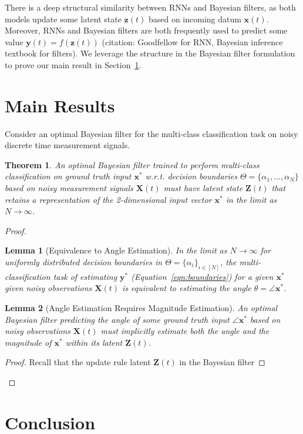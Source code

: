 \documentclass[12pt]{article}
\newtheorem{theorem}{Theorem}
\newtheorem{lemma}{Lemma}
\begin{document}
There is a deep structural similarity between RNNs and Bayesian filters, as
both models update some latent state $\mathbf z(t)$ based on incoming datum
$\mathbf x(t)$. 
Moreover, RNNs and Bayesian filters are both frequently used to predict some
value $\mathbf y(t) = f(\mathbf z(t))$ (citation: Goodfellow for RNN, Bayesian
inference textbook for filters).
We leverage the structure in the Bayesian filter formulation to prove our main
result in Section~\ref{sec:main}. 



\section{Main Results}
\label{sec:main}

Consider an optimal Bayesian filter for the multi-class classification task on 
noisy discrete time measurement signals. 



\begin{theorem}
	\label{thm:main}
	An optimal Bayesian filter trained to perform multi-class classification on
	ground truth input $\mathbf x^*$ w.r.t. decision boundaries 
	$\Theta = \{\alpha_1, \dots, \alpha_N\}$ based on noisy measurement signals
	$\mathbf X(t)$ must have latent state $\mathbf Z(t)$ that retains a
	representation of the 2-dimensional input vector $\mathbf x^*$ in the limit 
	as $N \to \infty$. 
\end{theorem}

\begin{proof}
	\begin{lemma}[Equivalence to Angle Estimation] 
		\label{lemma:angle_equiv}
		In the limit as $N\to\infty$ for uniformly distributed decision boundaries
		in $\Theta = \{\alpha_i\}_{i\in[N]}$, the multi-classification task of estimating 
		$\mathbf y^*$ (Equation~\ref{eqn:boundaries}) for a given $\mathbf x^*$
		given noisy observations $\mathbf X(t)$ is equivalent to estimating the
		angle $\theta = \angle \mathbf x^*$. 
	\end{lemma}

	\begin{lemma}[Angle Estimation Requires Magnitude Estimation]
		\label{lemma:angle_to_magnitude}
		An optimal Bayesian filter predicting the angle of some ground 
		truth input $\angle \mathbf x^*$ based on noisy observations 
		$\mathbf X(t)$ must implicitly estimate both the angle and the 
		magnitude of $\mathbf x^*$ within its latent $\mathbf Z(t)$. 
	\end{lemma}
	\begin{proof}
		Recall that the update rule latent $\mathbf Z(t)$ in the Bayesian 
		filter 
	\end{proof}

\end{proof}


\section{Conclusion}
\end{document}
